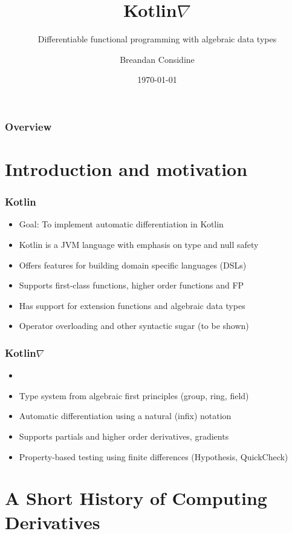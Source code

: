 \documentclass{beamer}
\title{Kotlin\texorpdfstring{$\nabla$}{}}
\subtitle{Differentiable functional programming with algebraic data types}
\author{Breandan Considine}
\institute[UdeM]{
Universit\'e de Montr\'eal \\
\medskip
\textit{breandan.considine@umontreal.ca}
}
\date{\today}
\begin{document}
    \begin{frame}
        \titlepage
    \end{frame}

    \begin{frame}
        \frametitle{Overview}
        \tableofcontents
    \end{frame}

    \section{Introduction and motivation}\label{sec:first-section}

    \begin{frame}
        \frametitle{Kotlin}
        \begin{itemize}
            \item Goal: To implement automatic differentiation in Kotlin
            \item Kotlin is a JVM language with emphasis on type and null safety
            \item Offers features for building domain specific languages (DSLs)
            \item Supports first-class functions, higher order functions and FP
            \item Has support for extension functions and algebraic data types
            \item Operator overloading and other syntactic sugar (to be shown)
        \end{itemize}
    \end{frame}

    \begin{frame}
        \frametitle{Kotlin\texorpdfstring{$\nabla$}{}}
        \begin{itemize}
            \item
            \item Type system from algebraic first principles (group, ring, field)
            \item Automatic differentiation using a natural (infix) notation
            \item Supports partials and higher order derivatives, gradients
            \item Property-based testing using finite differences (Hypothesis, QuickCheck)
        \end{itemize}
    \end{frame}

    \section{A Short History of Computing Derivatives}\label{sec:second-section}
\end{document}

